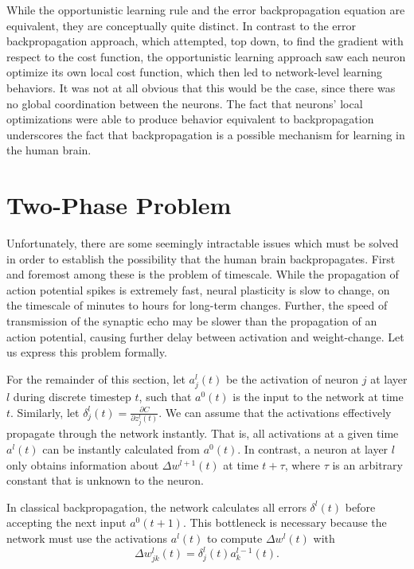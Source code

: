 \documentclass[12pt]{article}
\newcommand{\partialderiv}[2]{\frac{\partial #1}{\partial #2}}
\begin{document}
While the opportunistic learning rule and the error backpropagation equation are equivalent, they are conceptually quite distinct. In contrast to the error backpropagation approach, which attempted, top down, to find the gradient with respect to the cost function, the opportunistic learning approach saw each neuron optimize its own local cost function, which then led to network-level learning behaviors. It was not at all obvious that this would be the case, since there was no global coordination between the neurons. The fact that neurons' local optimizations were able to produce behavior equivalent to backpropagation underscores the fact that backpropagation is a possible mechanism for learning in the human brain.

\section{Two-Phase Problem}
Unfortunately, there are some seemingly intractable issues which must be solved in order to establish the possibility that the human brain backpropagates. First and foremost among these is the problem of timescale. While the propagation of action potential spikes is extremely fast, neural plasticity is slow to change, on the timescale of minutes to hours for long-term changes. \cite{Wei2021} Further, the speed of transmission of the synaptic echo may be slower than the propagation of an action potential, causing further delay between activation and weight-change. Let us express this problem formally.

For the remainder of this section, let $a_j^l(t)$ be the activation of neuron $j$ at layer $l$ during discrete timestep $t$, such that $a^0(t)$ is the input to the network at time $t$. Similarly, let $\delta^l_j(t) = \partialderiv{C}{z_j^l(t)}$. We can assume that the activations effectively propagate through the network instantly. That is, all activations at a given time $a^l(t)$ can be instantly calculated from $a^0(t)$. In contrast, a neuron at layer $l$ only obtains information about $\Delta w^{l+1}(t)$ at time $t + \tau$, where $\tau$ is an arbitrary constant that is unknown to the neuron.

In classical backpropagation, the network calculates all errors $\delta^l(t)$ before accepting the next input $a^0(t+1)$. This bottleneck is necessary because the network must use the activations $a^l(t)$ to compute $\Delta w^l(t)$ with
\begin{equation}
	\Delta w_{jk}^l(t) = \delta^l_j(t)a_k^{l-1}(t).
\end{equation}
\end{document}
